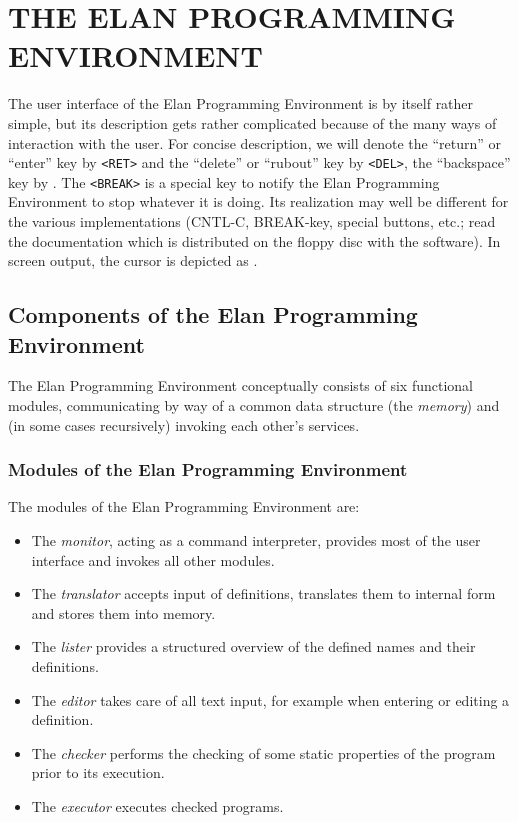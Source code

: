 \chapter{THE ELAN PROGRAMMING ENVIRONMENT}

The user interface of the Elan Programming Environment is by
itself rather simple, but its description gets rather complicated
because of the many ways of interaction with the user. For concise
description, we will denote the ``return'' or ``enter'' key by
{\tt <RET>} and the ``delete'' or ``rubout'' key by {\tt <DEL>},
the ``backspace'' key by {\tt <DEL LEFT>}.
The {\tt <BREAK>} is a special key to
notify the Elan Programming Environment to stop whatever it is
doing. Its realization may well be different for the various
implementations (CNTL-C, BREAK-key, special buttons, etc.; read
the documentation which is distributed on the floppy disc with the
software). In screen output, the cursor is depicted as \cursor.

\section{Components of the Elan Programming Environment}
 
The Elan Programming Environment conceptually consists of six
functional modules, communicating by way of a common data structure
(the {\em memory}) and (in some cases recursively) invoking each
other's services.

\subsection{Modules of the Elan Programming Environment}

The modules of the Elan Programming Environment are:

\begin{itemize}
\item	The {\em monitor}, acting as a command interpreter, provides
	most of the user interface and invokes all other modules.
\item	The {\em translator} accepts input of definitions, translates
	them to internal form and stores them into memory.
\item	The {\em lister} provides a structured overview of the
	defined names and their definitions.
\item	The {\em editor} takes care of all text input, for example
	when entering or editing a definition.
\item	The {\em checker} performs the checking of some static
	properties of the program prior to its execution.
\item	The {\em executor} executes checked programs.
\end{itemize}

